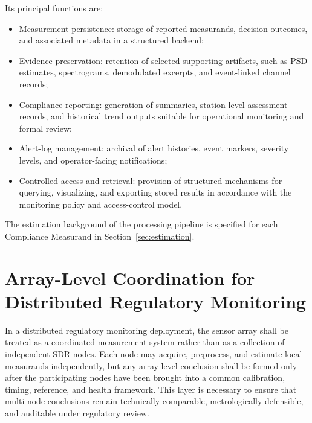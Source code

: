 \documentclass[11pt]{article}
\begin{document}
Its principal functions are:
\begin{itemize}
    \item Measurement persistence: storage of reported measurands, decision outcomes, and associated metadata in a structured backend;
    \item Evidence preservation: retention of selected supporting artifacts, such as PSD estimates, spectrograms, demodulated excerpts, and event-linked channel records;
    \item Compliance reporting: generation of summaries, station-level assessment records, and historical trend outputs suitable for operational monitoring and formal review;
    \item Alert-log management: archival of alert histories, event markers, severity levels, and operator-facing notifications;
    \item Controlled access and retrieval: provision of structured mechanisms for querying, visualizing, and exporting stored results in accordance with the monitoring policy and access-control model.
\end{itemize}

The estimation background of the processing pipeline is specified for each Compliance Measurand in Section~\ref{sec:estimation}.

\section{Array-Level Coordination for Distributed Regulatory Monitoring}

In a distributed regulatory monitoring deployment, the sensor array shall be treated as a coordinated measurement system rather than as a collection of independent SDR nodes. Each node may acquire, preprocess, and estimate local measurands independently, but any array-level conclusion shall be formed only after the participating nodes have been brought into a common calibration, timing, reference, and health framework. This layer is necessary to ensure that multi-node conclusions remain technically comparable, metrologically defensible, and auditable under regulatory review.
\end{document}

